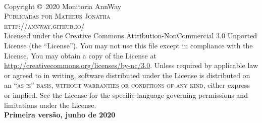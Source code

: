 \newpage
~\vfill
\thispagestyle{empty}

\noindent Copyright \copyright\ 2020 Monitoria AnnWay\\ %

\noindent \textsc{Publicadas por Matheus Jonatha}\\ %

\noindent  \textsc{http://annway.github.io/}\\ %

\noindent Licensed under the Creative Commons Attribution-NonCommercial 3.0 Unported License (the ``License''). You may not use this file except in compliance with the License. You may obtain a copy of the License at \url{http://creativecommons.org/licenses/by-nc/3.0}. Unless required by applicable law or agreed to in writing, software distributed under the License is distributed on an \textsc{``as is'' basis, without warranties or conditions of any kind}, either express or implied. See the License for the specific language governing permissions and limitations under the License.\\ %

\noindent \textbf{Primeira versão, junho de 2020} %